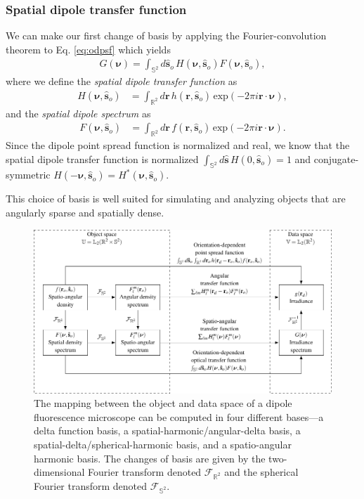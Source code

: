 \documentclass[]{osa-article}
\providecommand{\mb}[1]{\mathbf{#1}}
\providecommand{\so}{\mathbf{\hat{s}}_o}
\providecommand{\mh}[1]{\mathbf{\hat{#1}}}
\providecommand{\mbb}[1]{\mathbb{#1}}
\providecommand{\bs}[1]{\boldsymbol{#1}}
\providecommand{\bv}{\bs{\nu}}
\begin{document}
\subsubsection{Spatial dipole transfer function}
We can make our first change of basis by applying the Fourier-convolution
theorem to Eq. \ref{eq:odpsf} which yields
\begin{align}
G(\bv) = \int_{\mbb{S}^2}d\so\, H(\bv, \so)F(\bv, \so) \label{eq:odotf},
\end{align}
where we define the \textit{spatial dipole transfer function} as
  \begin{align}
  H(\bv, \so) &= \int_{\mbb{R}^2}d\mb{r}\, h(\mb{r}, \so)\, \text{exp}(-2\pi i\mb{r}\cdot\bv),
  \end{align}
  and the \textit{spatial dipole spectrum} as
  \begin{align}
  F(\bv, \so) &= \int_{\mbb{R}^2}d\mb{r}\, f(\mb{r}, \so)\, \text{exp}(-2\pi i\mb{r}\cdot\bv). 
  \end{align}
  Since the dipole point spread function is normalized and real, we know that
  the spatial dipole transfer function is normalized
  $\int_{\mbb{S}^2}d\mh{s}\, H(0, \so) = 1$ and conjugate-symmetric
  $H(-\bv, \so) = H^*(\bv, \so)$.
  
  This choice of basis is well suited for simulating and analyzing objects that
  are angularly sparse and spatially dense.

  \begin{figure}
  \hspace{-5em}
  \includegraphics[scale=1.0]{../figures/dipole-block/dipole-block.pdf}
  \caption{The mapping between the object and data space of a dipole
    fluorescence microscope can be computed in four different bases---a delta
    function basis, a spatial-harmonic/angular-delta basis, a
    spatial-delta/spherical-harmonic basis, and a spatio-angular harmonic basis.
    The changes of basis are given by the two-dimensional Fourier transform
    denoted $\mathcal{F}_{\mbb{R}^2}$ and the spherical Fourier transform
    denoted $\mathcal{F}_{\mbb{S}^2}$.}
   \label{fig:dipole-block}      
    \end{figure}
\end{document}
